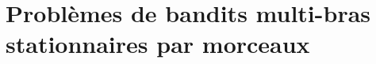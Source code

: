 \documentclass[11pt,french,ignorenonframetext,]{beamer}
\begin{document}




\section{\hfill{}Problèmes de bandits multi-bras stationnaires par morceaux\hfill{}}



\end{document}
